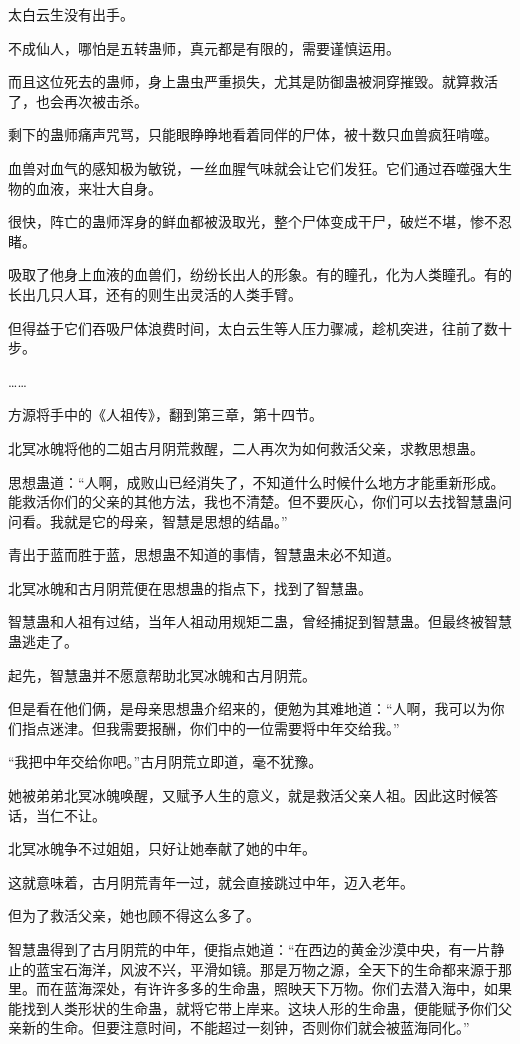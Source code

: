 \begin{this_body}
太白云生没有出手。

不成仙人，哪怕是五转蛊师，真元都是有限的，需要谨慎运用。

而且这位死去的蛊师，身上蛊虫严重损失，尤其是防御蛊被洞穿摧毁。就算救活了，也会再次被击杀。

剩下的蛊师痛声咒骂，只能眼睁睁地看着同伴的尸体，被十数只血兽疯狂啃噬。

血兽对血气的感知极为敏锐，一丝血腥气味就会让它们发狂。它们通过吞噬强大生物的血液，来壮大自身。

很快，阵亡的蛊师浑身的鲜血都被汲取光，整个尸体变成干尸，破烂不堪，惨不忍睹。

吸取了他身上血液的血兽们，纷纷长出人的形象。有的瞳孔，化为人类瞳孔。有的长出几只人耳，还有的则生出灵活的人类手臂。

但得益于它们吞吸尸体浪费时间，太白云生等人压力骤减，趁机突进，往前了数十步。

……

方源将手中的《人祖传》，翻到第三章，第十四节。

北冥冰魄将他的二姐古月阴荒救醒，二人再次为如何救活父亲，求教思想蛊。

思想蛊道：“人啊，成败山已经消失了，不知道什么时候什么地方才能重新形成。能救活你们的父亲的其他方法，我也不清楚。但不要灰心，你们可以去找智慧蛊问问看。我就是它的母亲，智慧是思想的结晶。”

青出于蓝而胜于蓝，思想蛊不知道的事情，智慧蛊未必不知道。

北冥冰魄和古月阴荒便在思想蛊的指点下，找到了智慧蛊。

智慧蛊和人祖有过结，当年人祖动用规矩二蛊，曾经捕捉到智慧蛊。但最终被智慧蛊逃走了。

起先，智慧蛊并不愿意帮助北冥冰魄和古月阴荒。

但是看在他们俩，是母亲思想蛊介绍来的，便勉为其难地道：“人啊，我可以为你们指点迷津。但我需要报酬，你们中的一位需要将中年交给我。”

“我把中年交给你吧。”古月阴荒立即道，毫不犹豫。

她被弟弟北冥冰魄唤醒，又赋予人生的意义，就是救活父亲人祖。因此这时候答话，当仁不让。

北冥冰魄争不过姐姐，只好让她奉献了她的中年。

这就意味着，古月阴荒青年一过，就会直接跳过中年，迈入老年。

但为了救活父亲，她也顾不得这么多了。

智慧蛊得到了古月阴荒的中年，便指点她道：“在西边的黄金沙漠中央，有一片静止的蓝宝石海洋，风波不兴，平滑如镜。那是万物之源，全天下的生命都来源于那里。而在蓝海深处，有许许多多的生命蛊，照映天下万物。你们去潜入海中，如果能找到人类形状的生命蛊，就将它带上岸来。这块人形的生命蛊，便能赋予你们父亲新的生命。但要注意时间，不能超过一刻钟，否则你们就会被蓝海同化。”


\end{this_body}
